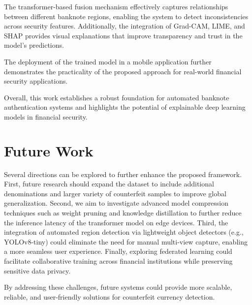 \documentclass[preprint,12pt,authoryear]{elsarticle}
\begin{document}
The transformer-based fusion mechanism effectively captures relationships between different banknote regions, enabling the system to detect inconsistencies across security features. Additionally, the integration of Grad-CAM, LIME, and SHAP provides visual explanations that improve transparency and trust in the model's predictions.

The deployment of the trained model in a mobile application further demonstrates the practicality of the proposed approach for real-world financial security applications.

Overall, this work establishes a robust foundation for automated banknote authentication systems and highlights the potential of explainable deep learning models in financial security.

\section{Future Work}

Several directions can be explored to further enhance the proposed framework. First, future research should expand the dataset to include additional denominations and larger variety of counterfeit samples to improve global generalization. Second, we aim to investigate advanced model compression techniques such as weight pruning and knowledge distillation to further reduce the inference latency of the transformer model on edge devices. Third, the integration of automated region detection via lightweight object detectors (e.g., YOLOv8-tiny) could eliminate the need for manual multi-view capture, enabling a more seamless user experience. Finally, exploring federated learning could facilitate collaborative training across financial institutions while preserving sensitive data privacy.

By addressing these challenges, future systems could provide more scalable, reliable, and user-friendly solutions for counterfeit currency detection.



\end{document}
